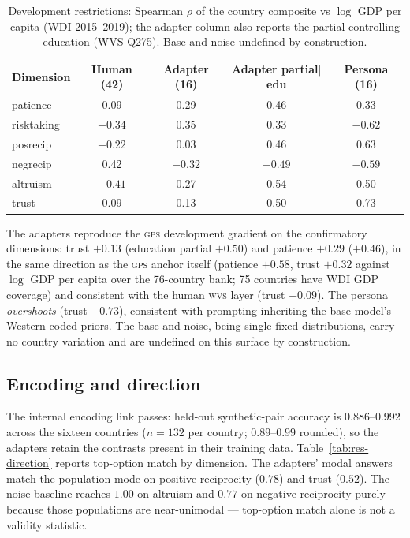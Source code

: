 \documentclass[10pt,letterpaper]{article}
\newcommand{\WVS}{\textsc{wvs}}
\newcommand{\GPS}{\textsc{gps}}
\begin{document}
\begin{table}[H]
\centering\small
\caption{Development restrictions: Spearman $\rho$ of the country composite vs $\log$ GDP per capita (WDI 2015--2019); the adapter column also reports the partial controlling education (WVS Q275). Base and noise undefined by construction.}\label{tab:res-dev}
\begin{tabular}{lcccc}
\toprule
Dimension & Human (42) & Adapter (16) & Adapter partial$|$edu & Persona (16)\\
\midrule
patience & 0.09 & 0.29 & 0.46 & 0.33\\
risktaking & $-0.34$ & 0.35 & 0.33 & $-0.62$\\
posrecip & $-0.22$ & 0.03 & 0.46 & 0.63\\
negrecip & 0.42 & $-0.32$ & $-0.49$ & $-0.59$\\
altruism & $-0.41$ & 0.27 & 0.54 & 0.50\\
trust & 0.09 & 0.13 & 0.50 & 0.73\\
\bottomrule
\end{tabular}
\end{table}

The adapters reproduce the \GPS{} development gradient on the confirmatory dimensions: trust $+0.13$ (education partial $+0.50$) and patience $+0.29$ ($+0.46$), in the same direction as the \GPS{} anchor itself (patience $+0.58$, trust $+0.32$ against $\log$ GDP per capita over the 76-country bank; 75 countries have WDI GDP coverage) and consistent with the human \WVS{} layer (trust $+0.09$). The persona \emph{overshoots} (trust $+0.73$), consistent with prompting inheriting the base model's Western-coded priors. The base and noise, being single fixed distributions, carry no country variation and are undefined on this surface by construction.

\subsection{Encoding and direction}
The internal encoding link passes: held-out synthetic-pair accuracy is $0.886$--$0.992$ across the sixteen countries ($n=132$ per country; $0.89$--$0.99$ rounded), so the adapters retain the contrasts present in their training data. Table~\ref{tab:res-direction} reports top-option match by dimension. The adapters' modal answers match the population mode on positive reciprocity ($0.78$) and trust ($0.52$). The noise baseline reaches $1.00$ on altruism and $0.77$ on negative reciprocity purely because those populations are near-unimodal --- top-option match alone is not a validity statistic.
\end{document}
